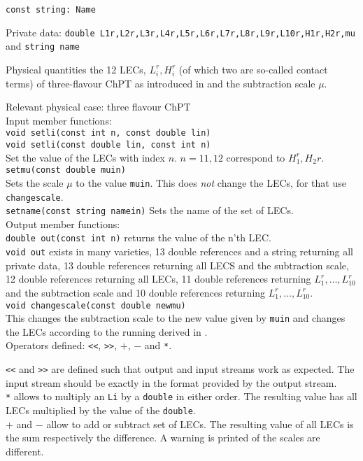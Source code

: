 \documentclass[12pt,a4paper]{article}
\newcommand{\mytt}[1]{\texttt{#1}}
\newcommand{\newfunction}[1]{\mytt{#1}\index{\mytt{#1}}}
\begin{document}
\mytt{const string: Name}


Private data: \mytt{double L1r,L2r,L3r,L4r,L5r,L6r,L7r,L8r,L9r,L10r,H1r,H2r,mu}
and \mytt{string name}

Physical quantities the 12 LECs, $L_i^r,H_i^r$
(of which two are so-called contact terms)
of three-flavour ChPT as introduced in \cite{Gasser:1984gg} and the subtraction
scale $\mu$.

Relevant physical case: three flavour ChPT\\

Input member functions:\\
\mytt{void \newfunction{setli}(const int n, const double lin)}\\
\mytt{void setli(const double lin, const int n)}\\
Set the value of the LECs with index $n$. $n=11,12$ correspond to
$H_1^r,H_2r$.\\
\mytt{\newfunction{setmu}(const double muin)}\\
Sets the scale $\mu$ to the value \mytt{muin}. This does \emph{not}
change the LECs, for that use \mytt{changescale}.\\
\mytt{\newfunction{setname}(const string namein)}
Sets the name of the set of LECs.\\

Output member functions:\\
\mytt{double \newfunction{out}(const int n)} returns the value of the n'th LEC.\\
\mytt{void out} exists in many varieties, 13 double references and a string
returning all private data, 13 double references returning all LECS and the subtraction scale, 12 double references returning all LECs,
11 double references returning $L_1^r,\ldots,L_{10}^r$ and the subtraction scale
and 10 double references returning $L_1^r,\ldots,L_{10}^r$.\\

\mytt{void \newfunction{changescale}(const double newmu)}\\
This changes the subtraction scale to the new value given by \mytt{muin} and
changes the LECs according to the running derived
in \cite{Gasser:1984gg}.\\

Operators defined: \newfunction{<<}, \newfunction{>>}, \newfunction{$+$}, \newfunction{$-$} and \newfunction{*}.

\mytt{<<} and \mytt{>>} are  defined such that output and input
streams work as expected. The input stream should be exactly in the format
provided by the output stream.\\
\mytt{*} allows to multiply an \mytt{Li} by a \mytt{double} in either order.
The resulting value has all LECs multiplied by the value of the \mytt{double}.\\
\mytt{$+$} and \mytt{$-$} allow to add or subtract set of LECs.
The resulting value of all LECs is the sum respectively the difference.
A warning is printed of the scales are different.
\end{document}
